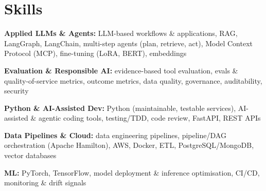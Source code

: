 \documentclass[10pt,a4paper]{article}
\begin{document}
\section{Skills}
\begin{tight}
  \item[\textcolor{accent}{\small$\bullet$}] \textbf{Applied LLMs \& Agents:} LLM-based workflows \& applications, RAG, LangGraph, LangChain, multi-step agents (plan, retrieve, act), Model Context Protocol (MCP), fine-tuning (LoRA, BERT), embeddings
  \item[\textcolor{accent}{\small$\bullet$}] \textbf{Evaluation \& Responsible AI:} evidence-based tool evaluation, evals \& quality-of-service metrics, outcome metrics, data quality, governance, auditability, security
  \item[\textcolor{accent}{\small$\bullet$}] \textbf{Python \& AI-Assisted Dev:} Python (maintainable, testable services), AI-assisted \& agentic coding tools, testing/TDD, code review, FastAPI, REST APIs
  \item[\textcolor{accent}{\small$\bullet$}] \textbf{Data Pipelines \& Cloud:} data engineering pipelines, pipeline/DAG orchestration (Apache Hamilton), AWS, Docker, ETL, PostgreSQL/MongoDB, vector databases
  \item[\textcolor{accent}{\small$\bullet$}] \textbf{ML:} PyTorch, TensorFlow, model deployment \& inference optimisation, CI/CD, monitoring \& drift signals
\end{tight}

\end{document}
